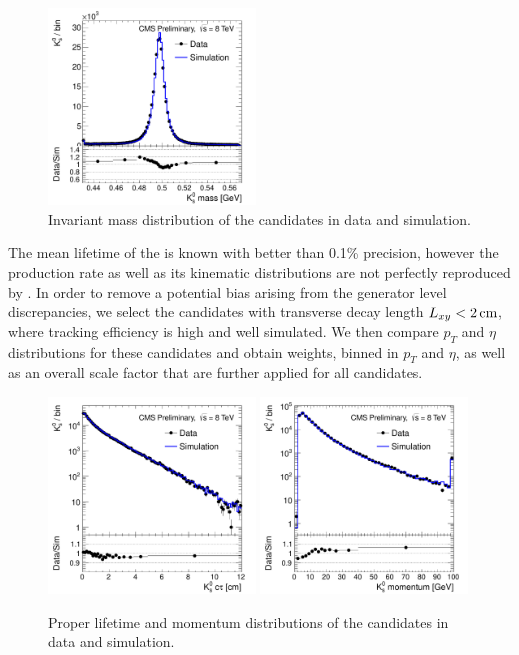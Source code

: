 \begin{figure}[htbp]
\centering
\includegraphics[width=0.49\textwidth]{plots/kshort/ksmass.pdf}
\caption{Invariant mass distribution of the \Kshort candidates in data and simulation. \label{fig:ksmass}}
\end{figure} 


The mean lifetime of the \Kshort is known with better than 0.1\% precision, however the \Kshort
production rate as well as its kinematic distributions are not perfectly reproduced 
by \PYTHIA \cite{Khachatryan:2011tm}.
In order to remove a potential bias arising from the generator level discrepancies, 
we select the \Kshort candidates with transverse decay length $L_{xy}<2\,\text{cm}$, where tracking efficiency
is high and well simulated. We then compare $p_T$ and $\eta$ distributions for these candidates and obtain
weights, binned in $p_T$ and $\eta$, as well as an overall scale factor that are further
 applied for all \Kshort candidates. 

\begin{figure}[htbp]
\centering
\includegraphics[width=0.49\textwidth]{plots/kshort/ksctau.pdf}
\includegraphics[width=0.49\textwidth]{plots/kshort/ksp.pdf}
\caption{Proper lifetime and momentum distributions of the \Kshort candidates in data and simulation. \label{fig:ksctau}}
\end{figure}

